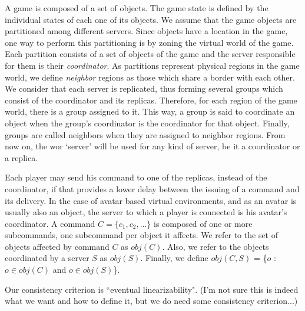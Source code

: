 \documentclass[times, 10pt]{article}
\begin{document}
A game is composed of a set of objects. The game state is defined by the individual states of each one of its objects. We assume that the game objects are partitioned among different servers. Since objects have a location in the game, one way to perform this partitioning is by zoning the virtual world of the game. Each partition consists of a set of objects of the game and the server responsible for them is their \emph{coordinator}. As partitions represent physical regions in the game world, we define \emph{neighbor} regions as those which share a border with each other. We consider that each server is replicated, thus forming several groups which consist of the coordinator and its replicas. Therefore, for each region of the game world, there is a group assigned to it. This way, a group is said to coordinate an object when the group's coordinator is the coordinator for that object. Finally, groups are called neighbors when they are assigned to neighbor regions. From now on, the wor `server' will be used for any kind of server, be it a coordinator or a replica.

Each player may send his command to one of the replicas, instead of the coordinator, if that provides a lower delay between the issuing of a command and its delivery. In the case of avatar based virtual environments, and as an avatar is usually also an object, the server to which a player is connected is his avatar's coordinator. A command $C = \{ c_1, c_2, ... \}$ is composed of one or more subcommands, one subcommand per object it affects. We refer to the set of objects affected by command $C$ as $obj(C)$. Also, we refer to the objects coordinated by a server $S$ as $obj(S)$. Finally, we define $obj(C,S)$ = \{$o$ : $o \in obj(C)$ and $o \in obj(S)$\}.


Our consistency criterion is ``eventual linearizability". (I'm not sure this is indeed what we want and how to define it, but we do need some consistency criterion...)
\end{document}
